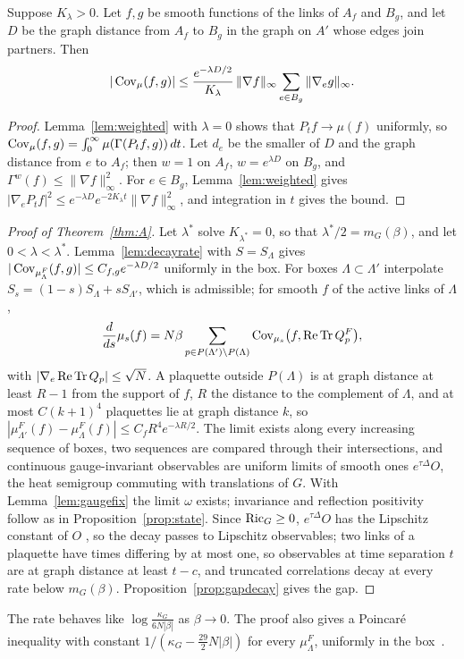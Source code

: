 \begin{lemma}\label{lem:decayrate}
Suppose $K_\lambda>0$. Let $f,g$ be smooth functions of the links of $A_f$ and
$B_g$, and let $D$ be the graph distance from $A_f$ to $B_g$ in the graph on
$A'$ whose edges join partners. Then
\[
|\operatorname{Cov}_\mu(f,g)|\le\frac{e^{-\lambda D/2}}{K_\lambda}\,\|\nabla f\|_\infty
\sum_{e\in B_g}\|\nabla_eg\|_\infty .
\]
\end{lemma}

\begin{proof}
Lemma~\ref{lem:weighted} with $\lambda=0$ shows that $P_tf\to\mu(f)$ uniformly,
so $\operatorname{Cov}_\mu(f,g)=\int_0^\infty\mu(\Gamma(P_tf,g))\,dt$. Let $d_e$ be the smaller of
$D$ and the graph distance from $e$ to $A_f$; then $w=1$ on $A_f$, $w=e^{\lambda
D}$ on $B_g$, and $\Gamma^w(f)\le\|\nabla f\|_\infty^2$. For $e\in B_g$,
Lemma~\ref{lem:weighted} gives $|\nabla_eP_tf|^2\le e^{-\lambda D}e^{-2K_\lambda t}
\|\nabla f\|_\infty^2$, and integration in $t$ gives the bound.
\end{proof}

\begin{proof}[Proof of Theorem~\ref{thm:A}]
Let $\lambda^*$ solve $K_{\lambda^*}=0$, so that $\lambda^*/2=m_G(\beta)$, and let
$0<\lambda<\lambda^*$. Lemma~\ref{lem:decayrate} with $S=S_\Lambda$ gives
$|\operatorname{Cov}_{\mu^F_\Lambda}(f,g)|\le C_{f,g}e^{-\lambda D/2}$ uniformly in the box. For
boxes $\Lambda\subset\Lambda'$ interpolate $S_s=(1-s)S_\Lambda+sS_{\Lambda'}$, which is
admissible; for smooth $f$ of the active links of $\Lambda$,
\[
\frac d{ds}\mu_s(f)=N\beta\sum_{p\in P(\Lambda')\setminus P(\Lambda)}\operatorname{Cov}_{\mu_s}
\bigl(f,\operatorname{Re}\operatorname{Tr} Q^F_p\bigr),
\]
with $|\nabla_e\operatorname{Re}\operatorname{Tr} Q_p|\le\sqrt N$. A plaquette outside $P(\Lambda)$ is at graph
distance at least $R-1$ from the support of $f$, $R$ the distance to the
complement of $\Lambda$, and at most $C(k+1)^4$ plaquettes lie at graph distance
$k$, so $|\mu^F_{\Lambda'}(f)-\mu^F_\Lambda(f)|\le C_fR^4e^{-\lambda R/2}$. The limit
exists along every increasing sequence of boxes, two sequences are compared
through their intersections, and continuous gauge-invariant observables are
uniform limits of smooth ones $e^{\tau\Delta}O$, the heat semigroup commuting
with translations of $G$. With Lemma~\ref{lem:gaugefix} the limit $\omega$ exists;
invariance and reflection positivity follow as in Proposition~\ref{prop:state}.
Since $\operatorname{Ric}_G\ge0$, $e^{\tau\Delta}O$ has the Lipschitz constant of $O$
\cite[Sect.~3.3]{BGL14}, so the decay passes to Lipschitz observables; two links
of a plaquette have times differing by at most one, so observables at time
separation $t$ are at graph distance at least $t-c$, and truncated
correlations decay at every rate below $m_G(\beta)$. Proposition~\ref{prop:gapdecay}
gives the gap.
\end{proof}

The rate behaves like $\log\frac{\kappa_G}{6N|\beta|}$ as $\beta\to0$. The proof
also gives a Poincar\'e inequality with constant $1/(\kappa_G-\frac{29}2N|\beta|)$
for every $\mu^F_\Lambda$, uniformly in the box~\cite[Cor.~5.7.2]{BGL14}.

